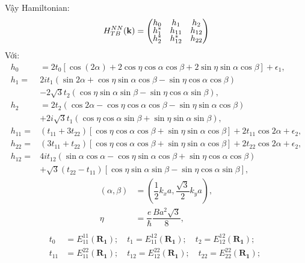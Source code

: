 \documentclass{report}
\begin{document}
\clearpage
Vậy Hamiltonian:
\begin{align}
	H_{TB}^{NN}(\mathbf{k}) =
	\begin{pmatrix}
		\renewcommand{\arraystretch}{0.72}
		h_0   & h_1      & h_2    \\
		h_1^* & h_{11}   & h_{12} \\
		h_2^* & h_{12}^* & h_{22}
	\end{pmatrix}
\end{align}\label{eq:1}
Với:
\begin{align}
	h_0      & = 2 t_0 \left[ \cos (2\alpha) + 2\cos\eta \cos\alpha\cos\beta + 2\sin\eta\sin\alpha\cos\beta\right] +   \epsilon_1,             \\
	h_1=     & 2 i t_1 (\sin 2\alpha + \cos\eta\sin\alpha\cos\beta -    \sin\eta\cos\alpha\cos\beta )       \nonumber                          \\
	         & - 2\sqrt{3}t_2\left( \cos\eta\sin\alpha\sin\beta - \sin\eta\cos\alpha\sin\beta  \right),                                        \\
	h_2      & = 2t_2 (\cos 2\alpha - \cos\eta\cos\alpha\cos\beta - \sin\eta\sin\alpha\cos\beta)                                               \\
	         & + 2i\sqrt{3}t_1(\cos\eta\cos\alpha\sin\beta +  \sin\eta\sin\alpha\sin\beta),                                                    \\
	h_{11}=  & (t_{11} + 3t_{22}) \left[ \cos\eta\cos\alpha\cos\beta + \sin\eta\sin\alpha\cos\beta \right] + 2t_{11}\cos2\alpha + \epsilon_2 , \\
	h_{22}=  & (3t_{11} + t_{22}) \left[ \cos\eta\cos\alpha\cos\beta + \sin\eta\sin\alpha\cos\beta \right] + 2t_{22}\cos2\alpha + \epsilon_2,  \\
	h_{12} = & 4it_{12}(\sin\alpha\cos\alpha -\cos\eta\sin\alpha\cos\beta + \sin\eta\cos\alpha\cos\beta ) \nonumber                            \\
	         & + \sqrt{3} (t_{22} - t_{11})\left[ \cos\eta\sin\alpha\sin\beta - \sin\eta\cos\alpha\sin\beta \right],
\end{align}
\begin{equation}
	\begin{split}
		(\alpha,\beta) & = \left(\dfrac{1}{2} k_x a,\dfrac{\sqrt{3}}{2} k_y a \right), \\
		\eta           & = \dfrac{e}{\hbar}\dfrac{Ba^2\sqrt{3}}{8},                    \\
	\end{split}
\end{equation}
\begin{equation}
	\begin{split}
		t_0    & = E_{11}^{11}(\mathbf{R_1}); \quad t_1 = E_{11}^{12}(\mathbf{R_1}); \quad t_2 = E_{12}^{12}(\mathbf{R_1}); \quad \\
		t_{11} & = E_{11}^{22}(\mathbf{R_1}); \quad t_{12} = E_{12}^{22}(\mathbf{R_1}); \quad t_{22} = E_{22}^{22}(\mathbf{R_1});
	\end{split}
\end{equation}
\end{document}

